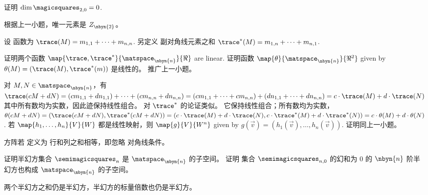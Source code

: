 \begin{exercises}
    证明 $\dim\magicsquares_{2,0}=0$.
    \begin{answer}
       根据上一小题，唯一元素是 $Z_{\nbyn{2}}$。
    \end{answer}
  \item   \label{exer:TraceIsLinear}
    设  函数为
    $\trace (M)=m_{1,1}+\cdots+m_{n,n}$.
    另定义
    副对角线元素之和
    $\trace^* (M)=m_{1,n}+\cdots+m_{n,1}$.
    \begin{exparts}
      \partsitem 
        证明两个函数
        $\map{\trace,\trace^*}{\matspace_{\nbyn{n}}}{\Re}$
        are linear.
      \partsitem
        证明函数
       $\map{\theta}{\matspace_{\nbyn{n}}}{\Re^2}$
       given by $\theta(M)=(\trace(M),\trace^*(m))$
       是线性的。
     \partsitem
       推广上一小题。 
    \end{exparts}
    \begin{answer}
      \begin{exparts}
        \partsitem
          对 $M,N\in\matspace_{\nbyn{n}}$，有
          $\trace(cM+dN)=(cm_{1,1}+dn_{1,1})+\cdots+(cm_{n,n}+dn_{n,n})
          =(cm_{1,1}+\cdots+cm_{n,n})+(dn_{1,1}+\cdots+dn_{n,n})
          =c\cdot\trace(M)+d\cdot\trace(N)$其中所有数均为实数，因此迹保持线性组合。
         对 $\trace^*$ 的论证类似。
       \partsitem
         它保持线性组合；所有数均为实数，
          $\theta(cM+dN)=(\trace(cM+dN),\trace^*(cM+dN))
          =(c\cdot\trace(M)+d\cdot\trace(N), c\cdot\trace^*(M)+d\cdot\trace^*(N))
          =c\cdot\theta(M)+d\cdot\theta(N)$.
       \partsitem   
         若 $\map{h_1,\ldots,h_n}{V}{W}$ 都是线性映射，则
         $\map{g}{V}{W^n}$ given by
         $g(\vec{v})=(h_1(\vec{v}), \ldots, h_n(\vec{v}))$.
         证明同上一小题。
      \end{exparts}
    \end{answer}
  \item 方阵若 定义为
     行和列之和相等，即忽略
     对角线条件。
     \begin{exparts*}
       \partsitem
         证明半幻方集合 $\semimagicsquares_n$
         是 $\matspace_{\nbyn{n}}$ 的子空间。
       \partsitem
         证明 
         集合 $\semimagicsquares_{n,0}$
         的幻和为 $0$ 的 $\nbyn{n}$ 阶半幻方也构成 $\matspace_{\nbyn{n}}$ 的子空间。
     \end{exparts*}
     \begin{answer}
       \begin{exparts*}
         \partsitem
           两个半幻方之和仍是半幻方，半幻方的标量倍数也仍是半幻方。
         \partsitem

\end{exparts*}
\end{answer}
\end{exercises}
